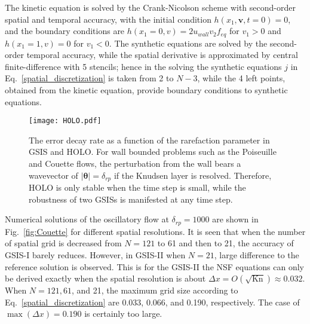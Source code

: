 \documentclass[onefignum,onetabnum]{siamart171218}
\begin{document}
The kinetic equation is solved by the Crank-Nicolson scheme with second-order spatial and temporal accuracy, with the initial condition $h(x_1,\bm{v},t=0)=0$, and the boundary conditions are $h(x_1=0,v)=2u_{wall}v_2f_{eq}$ for $v_1>0$  and $h(x_1=1,v)=0$ for $v_1<0$.
The synthetic equations are solved by the second-order temporal accuracy, while the spatial derivative is approximated by central finite-difference with 5 stencils; hence in the solving the synthetic equations $j$ in Eq.~\eqref{spatial_discretization} is taken from 2 to $N-3$, while the 4 left points, obtained from the kinetic equation, provide boundary conditions to synthetic equations. 








\begin{figure}[t]
	\centering
	\texttt{[image: HOLO.pdf]}
	\caption{
		The error decay rate as a function of the rarefaction parameter in GSIS and HOLO. For wall bounded problems such as the Poiseuille and Couette flows, the perturbation from the wall bears a wavevector of $|\bm{\theta}|=\delta_{rp}$ if the Knudsen layer is resolved. Therefore, HOLO is only stable when the time step is small, while the robustness of two GSISs is manifested at any time step.
	}
	\label{fig:HOLO_time_dependent}
\end{figure}


Numerical solutions of the oscillatory flow at $\delta_{rp}=1000$ are shown in Fig.~\ref{fig:Couette} for different spatial resolutions. It is seen that when the number of spatial grid is decreased from  $N=121$ to 61 and then to 21, the accuracy of GSIS-I barely reduces. However, in GSIS-II when $N=21$, large difference to the reference solution is observed. This is for the GSIS-II the NSF equations can only be derived exactly when the spatial resolution is about $\Delta{x}={O(\sqrt{\text{Kn}})}\approx0.032$. When $N=121, 61$, and 21, the maximum grid size according to Eq.~\eqref{spatial_discretization} are 0.033, 0.066, and 0.190, respectively. The case of $\max(\Delta{x})=0.190$ is certainly too large. 
\end{document}
